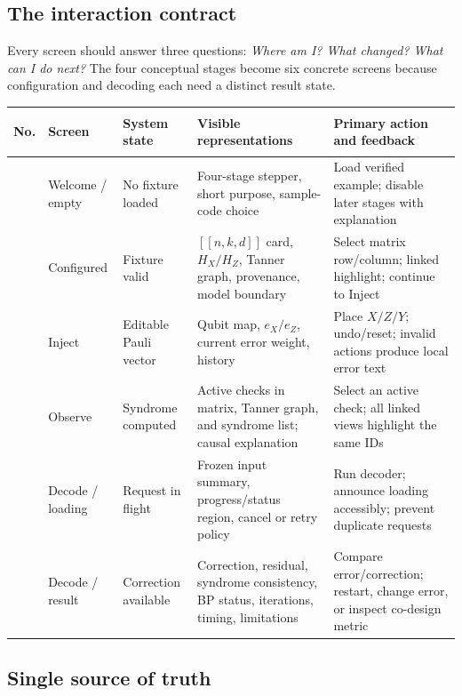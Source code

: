 \documentclass[11pt]{article}
\begin{document}
\subsection{The interaction contract}

Every screen should answer three questions: \emph{Where am I? What changed? What can I do next?}
The four conceptual stages become six concrete screens because configuration and decoding each need a
distinct result state.

\small
\begingroup
\setlength{\tabcolsep}{4pt}
\begin{longtable}{>{\bfseries\raggedright\arraybackslash}p{}
  >{\raggedright\arraybackslash}p{}
  >{\raggedright\arraybackslash}p{}
  >{\raggedright\arraybackslash}p{}
  >{\raggedright\arraybackslash}p{}}
\toprule
No. & Screen & System state & Visible representations & Primary action and feedback \\
\midrule
\endhead
1 & Welcome / empty & No fixture loaded & Four-stage stepper, short purpose, sample-code choice &
Load verified example; disable later stages with explanation \\
2 & Configured & Fixture valid & \([[n,k,d]]\) card, \(H_X/H_Z\), Tanner graph, provenance, model boundary &
Select matrix row/column; linked highlight; continue to Inject \\
3 & Inject & Editable Pauli vector & Qubit map, \(e_X/e_Z\), current error weight, history &
Place \(X/Z/Y\); undo/reset; invalid actions produce local error text \\
4 & Observe & Syndrome computed & Active checks in matrix, Tanner graph, and syndrome list; causal explanation &
Select an active check; all linked views highlight the same IDs \\
5 & Decode / loading & Request in flight & Frozen input summary, progress/status region, cancel or retry policy &
Run decoder; announce loading accessibly; prevent duplicate requests \\
6 & Decode / result & Correction available & Correction, residual, syndrome consistency, BP status, iterations, timing, limitations &
Compare error/correction; restart, change error, or inspect co-design metric \\
\bottomrule
\end{longtable}
\endgroup
\normalsize

\subsection{Single source of truth}
\end{document}
